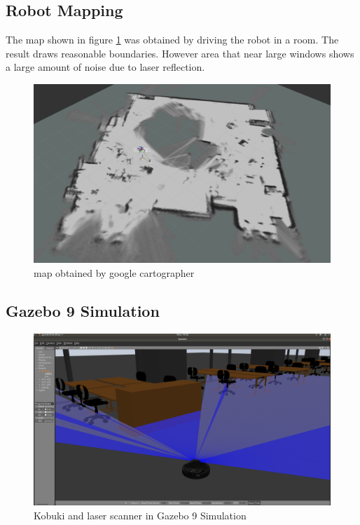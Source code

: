 \documentclass[letterpaper, 10 pt, conference]{ieeeconf}  %
\begin{document}
\subsection{Robot Mapping}
The map shown in figure \ref{fig:map} was obtained by driving the robot in a room. The result draws reasonable boundaries. However area that near large windows shows a large amount of noise due to laser reflection. 
\begin{figure}[ht]
  \includegraphics[width=\linewidth]{map.png}
  \caption{map obtained by google cartographer} 
  \label{fig:map}
\end{figure}
\subsection{Gazebo 9 Simulation}
\begin{figure}[ht]
  \includegraphics[width=\linewidth]{gazebo_simulation.png}
  \caption{Kobuki and laser scanner in Gazebo 9 Simulation } 
  \label{fig:gazebo}
\end{figure}
\end{document}
